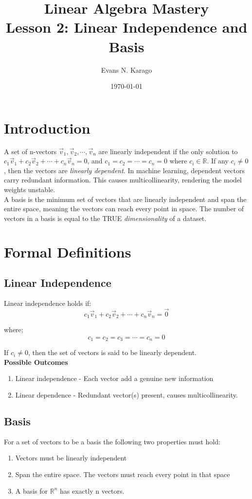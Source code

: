 \documentclass[11pt]{article}
\title{Linear Algebra Mastery \\ 
\large Lesson 2: Linear Independence and Basis}
\author{Evans N. Karago}
\date{\today}
\begin{document}
\maketitle

\section{Introduction}
A set of n-vectors $\vec v_1, \vec v_2, \cdots , \vec v_n$ are linearly independent if the only solution to $c_1\vec v_1 + c_2 \vec v_2 + \cdots + c_n\vec v_n = 0$, and $c_1 = c_2 = \cdots = c_n = 0$ where $c_i \in \mathbb{R}$. If any $c_i  \neq 0$, then the vectors are \textit{linearly dependent}. In machine learning, dependent vectors carry redundant information. This causes multicollinearity, rendering the model weights unstable.\\[0.15in]
A basis is the minimum set of vectors that are linearly independent and span the entire space, meaning the vectors can reach every point in space. The number of vectors in a basis is equal to the TRUE \textit{dimensionality} of a dataset.
\section{Formal Definitions}

\subsection{Linear Independence}
Linear independence holds if:
\[
c_1 \vec v_1 + c_2 \vec v_2 + \cdots + c_n \vec v_n = \vec 0
\]

where; 
\[
c_1 = c_2 = c_3 = \cdots = c_n = 0
\]

If $c_i \neq 0$, then the set of vectors is said to be linearly dependent.\\[0.15in]
\textbf{Possible Outcomes}
\begin{enumerate}
\item Linear independence - Each vector add a genuine new information
\item Linear dependence - Redundant vector(s) present, causes multicollinearity.
\end{enumerate}
\subsection{Basis}
For a set of vectors to be a basis  the following two properties must hold:
\begin{enumerate}
\item Vectors must be linearly independent
\item Span the entire space. The vectors must reach every point in that space
\item A basis for $\mathbb{R}^n$ has exactly n vectors.
\end{enumerate}
\end{document}
